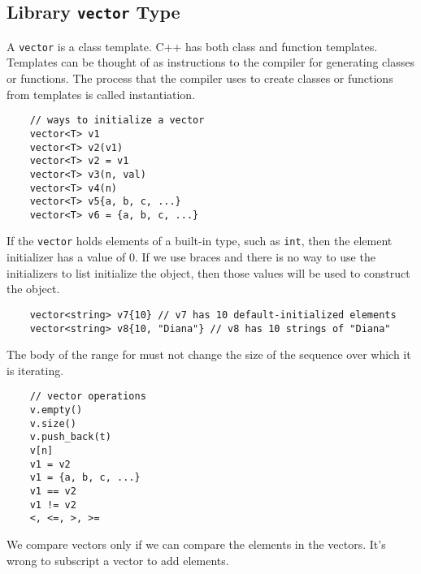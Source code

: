 \documentclass[11pt]{ctexart}
\begin{document}
\subsection{Library \texttt{vector} Type}
A \verb|vector| is a class template. C++ has both class and function templates. Templates can be thought of as instructions to the compiler for generating classes or functions. The process that the compiler uses to create classes or functions from templates is called instantiation. 
\begin{lstlisting}
    // ways to initialize a vector
    vector<T> v1
    vector<T> v2(v1)
    vector<T> v2 = v1
    vector<T> v3(n, val)
    vector<T> v4(n)
    vector<T> v5{a, b, c, ...}
    vector<T> v6 = {a, b, c, ...}
\end{lstlisting}
If the \verb|vector| holds elements of a built-in type, such as \verb|int|, then the element initializer has a value of 0. If we use braces and there is no way to use the initializers to list initialize the object, then those values will be used to construct the object.
\begin{lstlisting}
    vector<string> v7{10} // v7 has 10 default-initialized elements
    vector<string> v8{10, "Diana"} // v8 has 10 strings of "Diana" 
\end{lstlisting}
The body of the range for must not change the size of the sequence over which it is iterating.
\begin{lstlisting}
    // vector operations
    v.empty()
    v.size()
    v.push_back(t)
    v[n]
    v1 = v2
    v1 = {a, b, c, ...}
    v1 == v2
    v1 != v2
    <, <=, >, >=
\end{lstlisting}
We compare vectors only if we can compare the elements in the vectors. It's wrong to subscript a vector to add elements.
\end{document}
